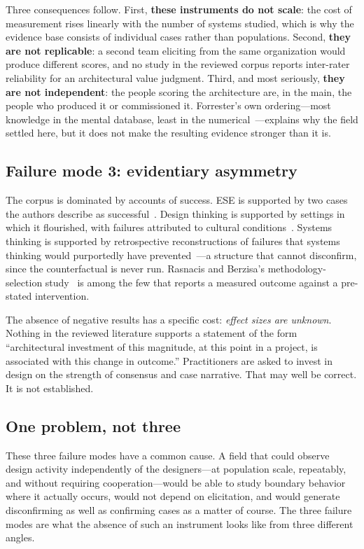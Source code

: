 \documentclass[11pt,a4paper]{article}
\begin{document}
Three consequences follow. First, \textbf{these instruments do not scale}: the
cost of measurement rises linearly with the number of systems studied, which is
why the evidence base consists of individual cases rather than populations.
Second, \textbf{they are not replicable}: a second team eliciting from the same
organization would produce different scores, and no study in the reviewed corpus
reports inter-rater reliability for an architectural value judgment. Third, and
most seriously, \textbf{they are not independent}: the people scoring the
architecture are, in the main, the people who produced it or commissioned it.
Forrester's own ordering---most knowledge in the mental database, least in the
numerical~\citep{forrester2009}---explains why the field settled here, but it
does not make the resulting evidence stronger than it is.

\subsection{Failure mode 3: evidentiary asymmetry}

The corpus is dominated by accounts of success. ESE is supported by two cases
the authors describe as successful~\citep{kotze2016}. Design thinking is
supported by settings in which it flourished, with failures attributed to
cultural conditions~\citep{dunne2018}. Systems thinking is supported by
retrospective reconstructions of failures that systems thinking would
purportedly have prevented~\citep{monat2020}---a structure that cannot
disconfirm, since the counterfactual is never run. Rasnacis and Berzisa's
methodology-selection study~\citep{rasnacis2017} is among the few that reports a
measured outcome against a pre-stated intervention.

The absence of negative results has a specific cost: \emph{effect sizes are
unknown}. Nothing in the reviewed literature supports a statement of the form
``architectural investment of this magnitude, at this point in a project, is
associated with this change in outcome.'' Practitioners are asked to invest in
design on the strength of consensus and case narrative. That may well be
correct. It is not established.

\subsection{One problem, not three}

These three failure modes have a common cause. A field that could observe design
activity independently of the designers---at population scale, repeatably, and
without requiring cooperation---would be able to study boundary behavior where
it actually occurs, would not depend on elicitation, and would generate
disconfirming as well as confirming cases as a matter of course. The three
failure modes are what the absence of such an instrument looks like from three
different angles.
\end{document}

